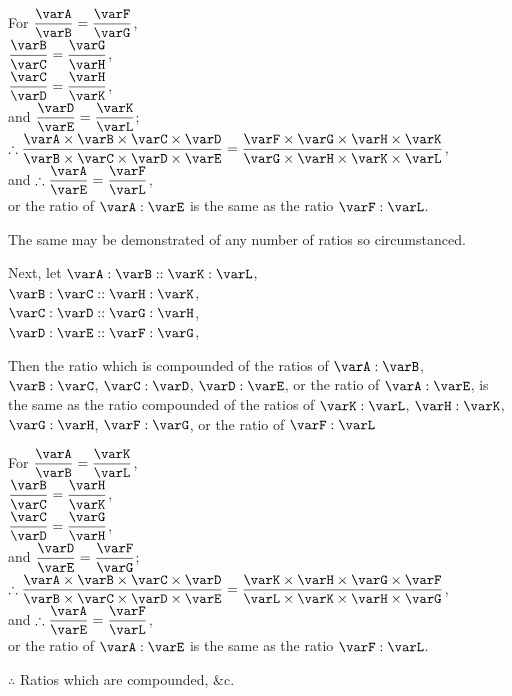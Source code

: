 \documentclass[booklanguage=english]{byrnebook}
\begin{document}
\begin{center}
For $\dfrac{\varA}{\varB} = \dfrac{\varF}{\varG}$,\\
$\dfrac{\varB}{\varC} = \dfrac{\varG}{\varH}$,\\
$\dfrac{\varC}{\varD} = \dfrac{\varH}{\varK}$,\\
and $\dfrac{\varD}{\varE} = \dfrac{\varK}{\varL}$;\\
$\therefore \dfrac{\varA \times \varB \times \varC \times \varD}{\varB \times \varC \times \varD \times \varE} = \dfrac{\varF \times \varG \times \varH \times \varK}{\varG \times \varH \times \varK \times \varL}$,\\
and $\therefore \dfrac{\varA}{\varE} = \dfrac{\varF}{\varL}$,\\
or the ratio of $\varA : \varE$ is the same as the ratio $\varF : \varL$.
\end{center}

The same may be demonstrated of any number of ratios so circumstanced.

\begin{center}
Next, let $\varA : \varB :: \varK : \varL$,\\
 $\varB : \varC :: \varH : \varK$,\\
$\varC : \varD :: \varG : \varH$,\\
$\varD : \varE :: \varF : \varG$,
\end{center}

Then the ratio which is compounded of the ratios of $\varA : \varB$, $\varB : \varC$, $\varC : \varD$, $\varD : \varE$, or the ratio of $\varA : \varE$, is the same as the ratio compounded of the ratios of $\varK : \varL$, $\varH : \varK$, $\varG : \varH$, $\varF : \varG$, or the ratio of $\varF : \varL$

\begin{center}
For $\dfrac{\varA}{\varB} = \dfrac{\varK}{\varL}$,\\
$\dfrac{\varB}{\varC} = \dfrac{\varH}{\varK}$,\\
$\dfrac{\varC}{\varD} = \dfrac{\varG}{\varH}$,\\
and $\dfrac{\varD}{\varE} = \dfrac{\varF}{\varG}$;\\
$\therefore \dfrac{\varA \times \varB \times \varC \times \varD}{\varB \times \varC \times \varD \times \varE} = \dfrac{\varK \times \varH \times \varG \times \varF}{\varL \times \varK \times \varH \times \varG}$,\\
and $\therefore \dfrac{\varA}{\varE} = \dfrac{\varF}{\varL}$,\\
or the ratio of $\varA : \varE$ is the same as the ratio $\varF : \varL$.

$\therefore$ Ratios which are compounded, \&c.
\end{center}
\vfill\pagebreak
\end{document}
